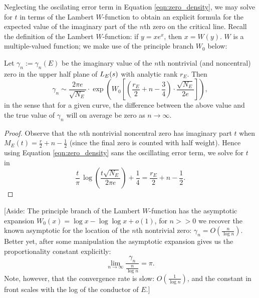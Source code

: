 Neglecting the oscilating error term in Equation \ref{eqn:zero_density}, we may solve for $t$ in terms of the Lambert $W$-function to obtain an explicit formula for the expected value of the imaginary part of the $n$th zero on the critical line. Recall the definition of the Lambert $W$-function: if $y = x e^x$, then $x = W(y)$. $W$ is a multiple-valued function; we make use of the principle branch $W_0$ below:
\begin{corollary}[GRH]\label{cor:gamma_n_approx_value}
Let $\gamma_n := \gamma_n(E)$ be the imaginary value of the $n$th nontrivial (and noncentral) zero in the upper half plane of $L_E(s)$ with analytic rank $r_E$. Then
\begin{equation}\label{approx:gamma_n}
\gamma_n \sim \frac{2\pi e}{\sqrt{N_E}} \cdot \exp \left(W_0\left[\left(\frac{r_E}{2} +n - \frac{3}{4}\right)\cdot \frac{\sqrt{N_E}}{2 e}\right]\right),
\end{equation}
in the sense that for a given curve, the difference between the above value and the true value of $\gamma_n$ will on average be zero as $n \to \infty$.
\end{corollary}
\begin{proof}
Observe that the $n$th nontrivial noncentral zero has imaginary part $t$ when $M_E(t) = \frac{r}{2} + n - \frac{1}{2}$ (since the final zero is counted with half weight). Hence using Equation \ref{eqn:zero_density} sans the oscillating error term, we solve for $t$ in
\begin{equation*}
\frac{t}{\pi} \, \log\left(\frac{t\sqrt{N_E}}{2\pi e}\right) + \frac{1}{4} = \frac{r_E}{2} + n - \frac{1}{2}.
\end{equation*}
\end{proof}

[Aside: The principle branch of the Lambert $W$-function has the asymptotic expansion $W_0(x) = \log x - \log \log x + o\left(1\right)$, for $n >> 0$ we recover the known asymptotic for the location of the $n$th nontrivial zero: $\gamma_n = O\left(\frac{n}{\log n} \right)$. Better yet, after some manipulation the asymptotic expansion gives us the proportionality constant explicitly:
\begin{equation}
\lim_{n \to \infty} \frac{\gamma_n}{\frac{n}{\log n}} = \pi.
\end{equation}
Note, however, that the convergence rate is slow: $O(\frac{1}{\log n})$, and the constant in front scales with the log of the conductor of $E$.] \\

